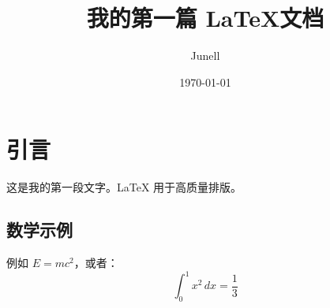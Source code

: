 \documentclass{article}    %
\title{我的第一篇 \LaTeX 文档}
\author{Junell}
\date{\today}
\begin{document}
\maketitle                %

\section{引言}
这是我的第一段文字。LaTeX 用于高质量排版。

\subsection{数学示例}
例如 $E = mc^2$，或者：
\[
  \int_0^1 x^2 \, dx = \frac{1}{3}
\]
\end{document}
